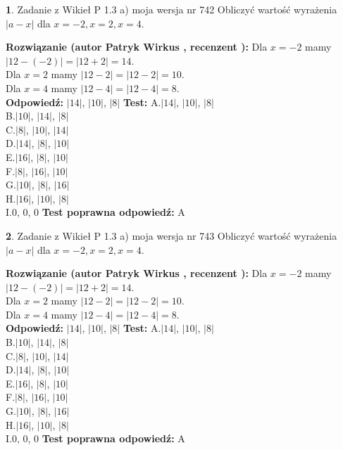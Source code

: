\documentclass[12pt, a4paper]{article}
\theoremstyle{definition} %
\newtheorem{zad}{}
\newcommand{\zadStart}[1]{\begin{zad}#1\newline}
\newcommand{\zadStop}{\end{zad}}
\newcommand{\rozwStart}[2]{\noindent \textbf{Rozwiązanie (autor #1 , recenzent #2): }\newline}
\newcommand{\rozwStop}{\newline}
\newcommand{\odpStart}{\noindent \textbf{Odpowiedź:}\newline}
\newcommand{\odpStop}{\newline}
\newcommand{\testStart}{\noindent \textbf{Test:}\newline}
\newcommand{\testStop}{\newline}
\newcommand{\kluczStart}{\noindent \textbf{Test poprawna odpowiedź:}\newline}
\newcommand{\kluczStop}{\newline}
\begin{document}
\zadStart{Zadanie z Wikieł P 1.3 a) moja wersja nr 742}
Obliczyć wartość wyrażenia $|a - x|$ dla $x=-2,x=2,x=4$.
\zadStop
\rozwStart{Patryk Wirkus}{}
Dla $x = -2$ mamy $|12 - (-2)| = |12 + 2| = 14$.\\
Dla $x = 2$ mamy $|12 - 2| = |12 - 2| = 10$.\\
Dla $x = 4$ mamy $|12 - 4| = |12 - 4| = 8$.\\
\rozwStop
\odpStart
$|14|$, $|10|$, $|8|$
\odpStop
\testStart
A.$|14|$, $|10|$, $|8|$\\
B.$|10|$, $|14|$, $|8|$\\
C.$|8|$, $|10|$, $|14|$\\
D.$|14|$, $|8|$, $|10|$\\
E.$|16|$, $|8|$, $|10|$\\
F.$|8|$, $|16|$, $|10|$\\
G.$|10|$, $|8|$, $|16|$\\
H.$|16|$, $|10|$, $|8|$\\
I.$0$, $0$, $0$
\testStop
\kluczStart
A
\kluczStop



\zadStart{Zadanie z Wikieł P 1.3 a) moja wersja nr 743}
Obliczyć wartość wyrażenia $|a - x|$ dla $x=-2,x=2,x=4$.
\zadStop
\rozwStart{Patryk Wirkus}{}
Dla $x = -2$ mamy $|12 - (-2)| = |12 + 2| = 14$.\\
Dla $x = 2$ mamy $|12 - 2| = |12 - 2| = 10$.\\
Dla $x = 4$ mamy $|12 - 4| = |12 - 4| = 8$.\\
\rozwStop
\odpStart
$|14|$, $|10|$, $|8|$
\odpStop
\testStart
A.$|14|$, $|10|$, $|8|$\\
B.$|10|$, $|14|$, $|8|$\\
C.$|8|$, $|10|$, $|14|$\\
D.$|14|$, $|8|$, $|10|$\\
E.$|16|$, $|8|$, $|10|$\\
F.$|8|$, $|16|$, $|10|$\\
G.$|10|$, $|8|$, $|16|$\\
H.$|16|$, $|10|$, $|8|$\\
I.$0$, $0$, $0$
\testStop
\kluczStart
A
\kluczStop
\end{document}
